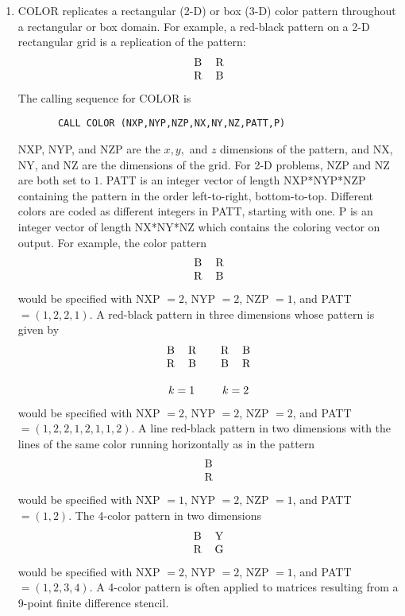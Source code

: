 \begin{enumerate}
  \item
       COLOR replicates a rectangular (2-D) or box (3-D) color
       pattern throughout a rectangular or box domain.  For
       example, a red-black pattern on a 2-D rectangular grid
       is a replication of the pattern:
       \[ \begin{tabular}{cc}
           B & R \\
           R & B
       \end{tabular} \]
       The calling sequence for COLOR is
       \begin{verbatim}
       CALL COLOR (NXP,NYP,NZP,NX,NY,NZ,PATT,P)  
       \end{verbatim}
       NXP, NYP, and NZP are the $x,y,$ and $z$ dimensions of the
       pattern, and NX, NY, and NZ are the dimensions of the grid.
       For 2-D problems, NZP and NZ are both set to $1$.  PATT is an
       integer vector of length NXP*NYP*NZP containing the pattern
       in the order left-to-right, bottom-to-top.  Different colors 
       are coded as different integers in PATT, starting with one.
       P is an integer vector of length NX*NY*NZ which contains
       the coloring vector on output.  For example, the color
       pattern
       \[ \begin{tabular}{cc}
           B & R \\
           R & B
       \end{tabular} \]
       would be specified with  NXP $=2$, NYP $=2$, NZP $=1$, and
       PATT $=(1,2,2,1)$.  A red-black pattern in three dimensions
       whose pattern is given by  
       \[ \begin{array}{cc}
          \begin{tabular}{cc}
           B & R \\
           R & B 
          \end{tabular} &
          \begin{tabular}{cc}
           R & B \\
           B & R 
          \end{tabular} \\
          & \\
          k=1 & k=2
         \end{array} \]
       would be specified with  NXP $=2$, NYP $=2$, NZP $=2$, and
       PATT $=(1,2,2,1,2,1,1,2)$.  A line red-black pattern in two 
       dimensions with the lines of the same color running 
       horizontally as in the pattern
       \[  \begin{tabular}{c}
            B \\
            R
        \end{tabular} \]
       would be specified with NXP $=1$, NYP $=2$, NZP $=1$, and
       PATT $=(1,2)$. The 4-color pattern in two dimensions
       \[ \begin{tabular}{cc}
           B & Y \\
           R & G  
       \end{tabular} \]
       would be specified with  NXP $=2$, NYP $=2$, NZP $=1$, and
       PATT $=(1,2,3,4)$.  A 4-color pattern is often applied
       to matrices resulting from a 9-point finite difference stencil. 


\end{enumerate}
